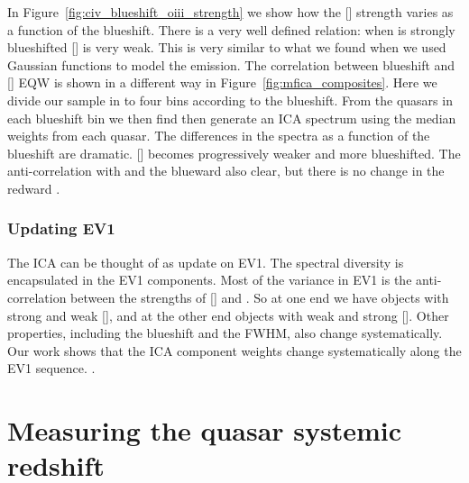 In Figure~\ref{fig:civ_blueshift_oiii_strength} we show how the [] strength varies as a function of the  blueshift. 
There is a very well defined relation: when  is strongly blueshifted [] is very weak. 
This is very similar to what we found when we used Gaussian functions to model the emission. 
The correlation between  blueshift and [] EQW is shown in a different way in Figure~\ref{fig:mfica_composites}. 
Here we divide our sample in to four bins according to the  blueshift. 
From the quasars in each  blueshift bin we then find then generate an \ac{ICA} spectrum using the median weights from each quasar. 
The differences in the spectra as a function of the  blueshift are dramatic. 
[] becomes progressively weaker and more blueshifted.
The anti-correlation with  and the blueward  also clear, but there is no change in the redward . 

\subsubsection{Updating \ac{EV1}}

The \ac{ICA} can be thought of as update on \ac{EV1}. 
The spectral diversity is encapsulated in the \ac{EV1} components. 
Most of the variance in \ac{EV1} is the anti-correlation between the strengths of [] and . 
So at one end we have objects with strong  and weak [], and at the other end objects with weak  and strong []. 
Other properties, including the  blueshift and the \hb FWHM, also change systematically. 
Our work shows that the \ac{ICA} component weights change systematically along the \ac{EV1} sequence. 
. 

\section{Measuring the quasar systemic redshift}

